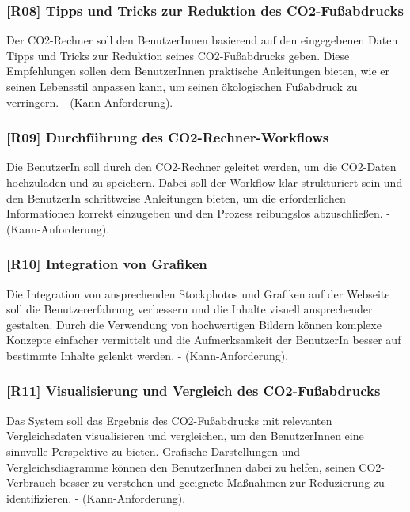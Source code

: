 \subsubsection{[R08] Tipps und Tricks zur Reduktion des CO2-Fußabdrucks}

Der CO2-Rechner soll den BenutzerInnen basierend auf den eingegebenen Daten Tipps und Tricks zur Reduktion seines CO2-Fußabdrucks geben.
Diese Empfehlungen sollen dem BenutzerInnen praktische Anleitungen bieten, wie er seinen Lebensstil anpassen kann, um seinen ökologischen Fußabdruck zu verringern. - (Kann-Anforderung).

\subsubsection{[R09] Durchführung des CO2-Rechner-Workflows}

Die BenutzerIn soll durch den CO2-Rechner geleitet werden, um die CO2-Daten hochzuladen und zu speichern. Dabei soll der Workflow klar strukturiert sein und den BenutzerIn schrittweise Anleitungen bieten, um die erforderlichen Informationen korrekt einzugeben und den Prozess reibungslos abzuschließen. - (Kann-Anforderung).

\subsubsection{[R10] Integration von Grafiken}

Die Integration von ansprechenden Stockphotos und Grafiken auf der Webseite soll die Benutzererfahrung verbessern und die Inhalte visuell ansprechender gestalten. Durch die Verwendung von hochwertigen Bildern können komplexe Konzepte einfacher vermittelt und die Aufmerksamkeit der BenutzerIn besser auf bestimmte Inhalte gelenkt werden. - (Kann-Anforderung).

\subsubsection{[R11] Visualisierung und Vergleich des CO2-Fußabdrucks}

Das System soll das Ergebnis des CO2-Fußabdrucks mit relevanten Vergleichsdaten visualisieren und vergleichen, um den BenutzerInnen eine sinnvolle Perspektive zu bieten. Grafische Darstellungen und Vergleichsdiagramme können den BenutzerInnen dabei zu helfen, seinen CO2-Verbrauch besser zu verstehen und geeignete Maßnahmen zur Reduzierung zu identifizieren. - (Kann-Anforderung).


